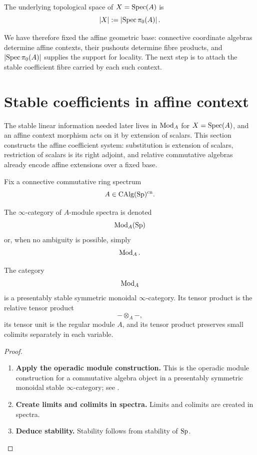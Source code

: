 \begin{definition}
\label{def:underlying-topological-space-affine-spectral}
The underlying topological space of $X=\operatorname{Spec}(A)$ is
\[
    |X|
    :=
    \left|\operatorname{Spec}\pi_0(A)\right|.
\]
\end{definition}

We have therefore fixed the affine geometric base: connective coordinate
algebras determine affine contexts, their pushouts determine fibre products,
and \(\lvert\operatorname{Spec}\pi_0(A)\rvert\) supplies the support for locality. The next
step is to attach the stable coefficient fibre carried by each such context.

\section{Stable coefficients in affine context}
\label{sec:module-spectra-relative-algebras}

The stable linear information needed later lives in \(\operatorname{Mod}_A\) for
\(X=\operatorname{Spec}(A)\), and an affine context morphism acts on it by extension of
scalars. This section
constructs the affine coefficient system: substitution is extension of
scalars, restriction of scalars is its right adjoint, and relative
commutative algebras already encode affine extensions over a fixed base.

Fix a connective commutative ring spectrum
\[
    A\in\operatorname{CAlg}(\operatorname{Sp})^{\mathrm{cn}}.
\]

\begin{definition}
\label{def:module-spectrum-over-a}
The $\infty$-category of $A$-module spectra is denoted
\[
    \operatorname{Mod}_A(\operatorname{Sp})
\]
or, when no ambiguity is possible, simply
\[
    \operatorname{Mod}_A.
\]
\end{definition}

\begin{theorem}
\label{thm:spectral-module-category}
The category
\[
    \operatorname{Mod}_A
\]
is a presentably stable symmetric monoidal $\infty$-category. Its tensor
product is the relative tensor product
\[
    -\otimes_A-,
\]
its tensor unit is the regular module $A$, and its tensor product preserves
small colimits separately in each variable.
\end{theorem}

\begin{proof}
\leavevmode
\begin{enumerate}[label=\textup{(\arabic*)}]
    \item \textbf{Apply the operadic module construction.}
    This is the operadic module construction for a commutative algebra object
    in a presentably symmetric monoidal stable $\infty$-category; see
    \cite[Theorem~4.5.2.1]{LurieHigherAlgebra}.

    \item \textbf{Create limits and colimits in spectra.}
    Limits and colimits are created
    in spectra.

    \item \textbf{Deduce stability.}
    Stability follows from stability of $\operatorname{Sp}$.
\end{enumerate}
\end{proof}

